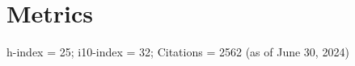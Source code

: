 \documentclass[margin,line,12pt]{res}
\newcommand\reverselabel[1]{%
  \def\theenumi{}%
  \renewcommand\makelabel{\makebox[\dimexpr\labelwidth-3pt\relax][r]{%
    \the\numexpr#1-\value{enumi}+1\relax}}}%
\begin{document}
\begin{resume}
\begin{itemize}







\end{itemize}

\section{\sc Metrics}
h-index = 25; i10-index = 32; Citations = 2562 (as of June 30, 2024)





\end{resume}
\end{document}
